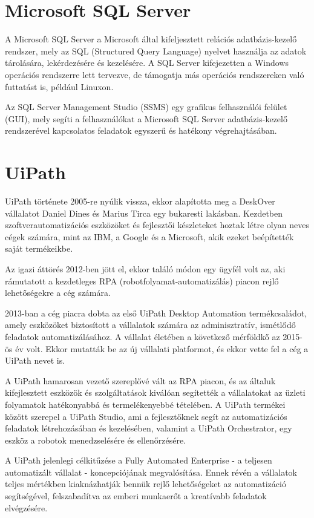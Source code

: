 \documentclass[
]{thesis-ekf}
\theoremstyle{definition}
\theoremstyle{remark}
\begin{document}
\section{Microsoft SQL Server}
A Microsoft SQL Server a Microsoft által kifeljesztett relációs adatbázis-kezelő rendszer, mely az SQL (Structured Query Language) nyelvet használja az adatok tárolására, lekérdezésére és kezelésére. A SQL Server kifejezetten a Windows operációs rendszerre lett tervezve, de támogatja más operációs rendszereken való futtatást is, például Linuxon.

Az SQL Server Management Studio (SSMS) egy grafikus felhasználói felület (GUI), mely segíti a felhasználókat a Microsoft SQL Server adatbázis-kezelő rendszerével kapcsolatos feladatok egyszerű és hatékony végrehajtásában. 
\section{UiPath}
UiPath története 2005-re nyúlik vissza, ekkor alapította meg a DeskOver vállalatot Daniel Dines és Marius Tirca egy bukaresti lakásban. Kezdetben szoftverautomatizációs eszközöket és fejlesztői készleteket hoztak létre olyan neves cégek számára, mint az IBM, a Google és a Microsoft, akik ezeket beépítették saját termékeikbe. 

Az igazi áttörés 2012-ben jött el, ekkor találó módon egy ügyfél volt az, aki rámutatott a kezdetleges RPA (robotfolyamat-automatizálás) piacon rejlő lehetőségekre a cég számára.

2013-ban a cég piacra dobta az első UiPath Desktop Automation termékcsaládot, amely eszközöket biztosított a vállalatok számára az adminisztratív, ismétlődő feladatok automatizálásához. A vállalat életében a következő mérföldkő az 2015-ös év volt. Ekkor mutatták be az új vállalati platformot, és ekkor vette fel a cég a UiPath nevet is.

A UiPath hamarosan vezető szereplővé vált az RPA piacon, és az általuk kifejlesztett eszközök és szolgáltatások kiválóan segítették a vállalatokat az üzleti folyamatok hatékonyabbá és termelékenyebbé tételében. A UiPath termékei között szerepel a UiPath Studio, ami a fejlesztőknek segít az automatizációs feladatok létrehozásában és kezelésében, valamint a UiPath Orchestrator, egy eszköz a robotok menedzselésére és ellenőrzésére.

A UiPath jelenlegi célkitűzése a Fully Automated Enterprise - a teljesen automatizált vállalat - koncepciójának megvalósítása. Ennek révén a vállalatok teljes mértékben kiaknázhatják bennük rejlő lehetőségeket az automatizáció segítségével, felszabadítva az emberi munkaerőt a kreatívabb feladatok elvégzésére.
\end{document}
